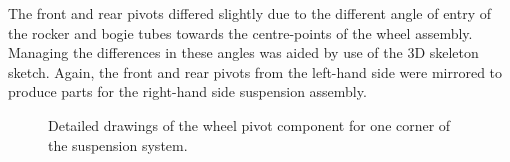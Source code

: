         The front and rear pivots differed slightly due to the different angle of entry of the rocker and bogie tubes towards the centre-points of the wheel assembly. Managing the differences in these angles was aided by use of the 3D skeleton sketch. Again, the front and rear pivots from the left-hand side were mirrored to produce parts for the right-hand side suspension assembly.
       
        \begin{figure}[h!]
        \centering
        \caption[Detailed drawings of the wheel pivot component for one corner of the suspension system.]{Detailed drawings of the wheel pivot component for one corner of the suspension system.}
        \label{fig:mechDesign-wheelPivotDetail}
        \end{figure}
          
